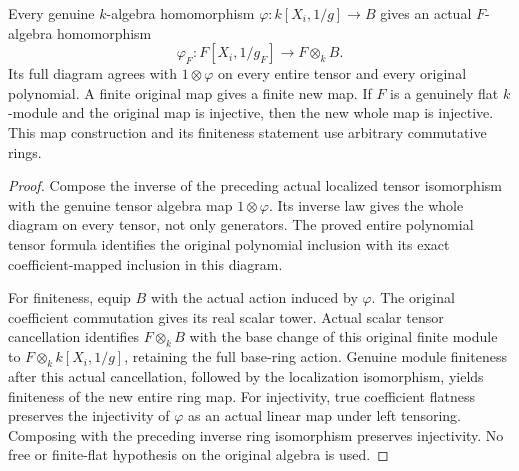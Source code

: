 \begin{theorem}
\label{algebra:principal-open-scalar-map}
\leanok
{}
Every genuine $k$-algebra homomorphism
$\varphi:k[X_i,1/g]\to B$ gives an actual $F$-algebra homomorphism
\[
 \varphi_F:F[X_i,1/g_F]\longrightarrow F\otimes_k B.
\]
Its full diagram agrees with $1\otimes\varphi$ on every entire tensor
and every original polynomial. A finite original map gives a finite
new map. If $F$ is a genuinely flat $k$-module and the original map is
injective, then the new whole map is injective. This map construction
and its finiteness statement use arbitrary commutative rings.
\end{theorem}
\begin{proof}
Compose the inverse of the preceding actual localized tensor isomorphism
with the genuine tensor algebra map $1\otimes\varphi$. Its inverse law
gives the whole diagram on every tensor, not only generators. The proved
entire polynomial tensor formula identifies the original polynomial
inclusion with its exact coefficient-mapped inclusion in this diagram.

For finiteness, equip $B$ with the actual action induced by $\varphi$.
The original coefficient commutation gives its real scalar tower.
Actual scalar tensor cancellation identifies $F\otimes_k B$ with the
base change of this original finite module to
$F\otimes_k k[X_i,1/g]$, retaining the full base-ring action. Genuine
module finiteness after this actual cancellation, followed by the
localization isomorphism, yields finiteness of the new entire ring map.
For injectivity, true coefficient flatness preserves the injectivity
of $\varphi$ as an actual linear map under left tensoring. Composing
with the preceding inverse ring isomorphism preserves injectivity.
No free or finite-flat hypothesis on the original algebra is used.
\end{proof}

